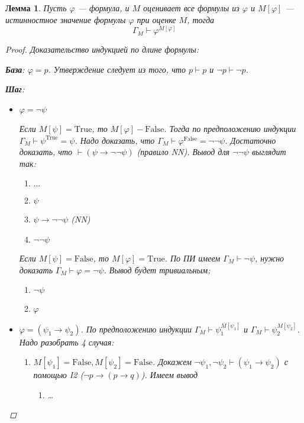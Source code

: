 \documentclass[12pt]{article}
\let\im\rightarrow
\let\n\neg
\theoremstyle{definition}
\theoremstyle{plain}
\newtheorem{lemma}{Лемма}[section]
\theoremstyle{remark}
\begin{document}
\begin{lemma}
  Пусть $\varphi$ --- формула, и $M$ оценивает все формулы из
  $\varphi$ и $M[\varphi]$ --- истинностное значение формулы
  $\varphi$ при оценке $M$, тогда
  \[
    \Gamma_M \vdash \varphi^{M[\varphi]}
  \]
  \begin{proof}
    Доказательство индукцией по длине формулы:

    \textbf{База}: $\varphi = p$. Утверждение следует из того, что $p
    \vdash p$ и $\n p \vdash \n p$.

    \textbf{Шаг}:
    \begin{itemize}
      \item $\varphi = \n \psi$

        Если $M[\psi] = \mathrm{True}$, то $M[\varphi] -
        \mathrm{False}$. Тогда по предположению индукции $\Gamma_M
        \vdash \psi^{\mathrm{True}} = \psi$. Надо доказать, что
        $\Gamma_M \vdash \varphi^{\mathrm{False}} = \n \n \psi$.
        Достаточно доказать, что $\vdash (\psi \im \n \n \psi)$
        (правило NN). Вывод для $\n \n \psi$ выглядит так:
        \begin{enumerate}
          \item $\dots$

          \item $\psi$

          \item $\psi \im \n \n \psi$ (NN)

          \item $\n \n \psi$
        \end{enumerate}

        Если $M[\psi] = \mathrm{False}$, то $M[\varphi] =
        \mathrm{True}$. По ПИ имеем $\Gamma_M \vdash \n \psi$, нужно
        доказать $\Gamma_M \vdash \varphi = \n \psi$. Вывод будет тривиальным;
        \begin{enumerate}
          \item $\n \psi$

          \item $\varphi$
        \end{enumerate}

      \item $\varphi = (\psi_1 \im \psi_2)$. По предположению
        индукции $\Gamma_M \vdash \psi_1^{M[\psi_1]}$ и $\Gamma_M
        \vdash \psi_2^{M[\psi_2]}$. Надо разобрать 4 случая:
        \begin{enumerate}
          \item $M[\psi_1] = \mathrm{False}, M[\psi_2] =
            \mathrm{False}$. Докажем $\n \psi_1, \n \psi_2 \vdash
            (\psi_1 \im \psi_2)$ с помощью I2 ($\n p \im (p \im q)$).
            Имеем вывод
            \begin{enumerate}
              \item \dots


\end{enumerate}
\end{enumerate}
\end{itemize}
\end{proof}
\end{lemma}
\end{document}
